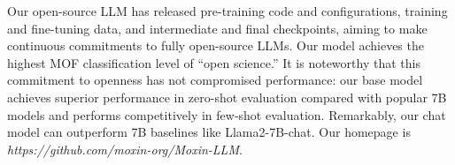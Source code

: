 Our open-source LLM has released pre-training code and configurations, training and fine-tuning data, and intermediate and final checkpoints, aiming to make continuous commitments to fully open-source LLMs. Our model achieves the highest MOF classification level of ``open science.'' It is noteworthy that this commitment to openness has not compromised performance: our base model achieves superior performance in zero-shot evaluation compared with popular 7B models and performs competitively in few-shot evaluation. Remarkably, our chat model can outperform 7B baselines like Llama2-7B-chat. Our homepage is \textit{https://github.com/moxin-org/Moxin-LLM}. 